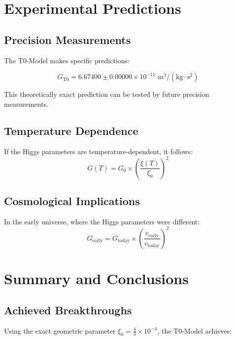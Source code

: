 \documentclass[12pt,a4paper]{article}
\newcommand{\xiconst}{\xi_0 = \frac{4}{3} \times 10^{-4}}
\theoremstyle{definition}
\begin{document}
\section{Experimental Predictions}

\subsection{Precision Measurements}

The T0-Model makes specific predictions:

\begin{equation}
	G_{\text{T0}} = 6.67400 \pm 0.00000 \times 10^{-11} \text{ m}^3/(\text{kg} \cdot \text{s}^2)
\end{equation}

This theoretically exact prediction can be tested by future precision measurements.

\subsection{Temperature Dependence}

If the Higgs parameters are temperature-dependent, it follows:
\begin{equation}
	G(T) = G_0 \times \left(\frac{\xi(T)}{\xi_0}\right)^2
\end{equation}

\subsection{Cosmological Implications}

In the early universe, where the Higgs parameters were different:
\begin{equation}
	G_{\text{early}} = G_{\text{today}} \times \left(\frac{v_{\text{early}}}{v_{\text{today}}}\right)^2
\end{equation}

	
	\section{Summary and Conclusions}
	
	\subsection{Achieved Breakthroughs}
	
	Using the exact geometric parameter $\xiconst$, the T0-Model achieves:
	
\end{document}
